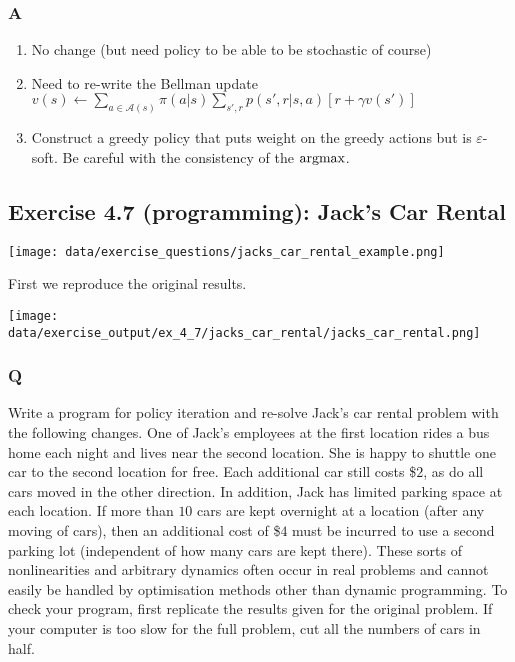 \subsubsection{A}
\begin{enumerate}
    \item No change (but need policy to be able to be stochastic of course)
    \item Need to re-write the Bellman update $v(s) \longleftarrow \sum_{a \in \mathcal{A}(s)} \pi(a|s)\sum_{s', r}p(s', r|s, a)\left[ r + \gamma v(s') \right]$
    \item Construct a greedy policy that puts weight on the greedy actions but is $\varepsilon$-soft. Be careful with the consistency of the $\operatorname*{argmax}$.
\end{enumerate}

\subsection{Exercise 4.7 (programming): Jack's Car Rental}

\texttt{[image: data/exercise\_questions/jacks\_car\_rental\_example.png]}

First we reproduce the original results.

\texttt{[image: data/exercise\_output/ex\_4\_7/jacks\_car\_rental/jacks\_car\_rental.png]}

\subsubsection{Q}
Write a program for policy iteration and re-solve Jack’s car rental problem with the following changes. One of Jack’s employees at the first location rides a bus home each night and lives near the second location. She is happy to shuttle one car to the second location for free. Each additional car still costs \$$2$, as do all cars moved in the other direction. In addition, Jack has limited parking space at each location. If more than $10$ cars are kept overnight at a location (after any moving of cars), then an additional cost of \$$4$ must be incurred to use a second parking lot (independent of how many cars are kept there). These sorts of nonlinearities and arbitrary dynamics often occur in real problems and cannot easily be handled by optimisation methods other than dynamic programming. To check your program, first replicate the results given for the original problem. If your computer is too slow for the full problem, cut all the numbers of cars in half.

